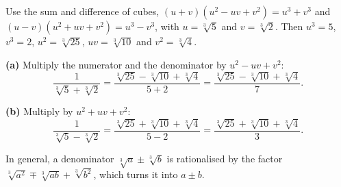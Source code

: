 Use the sum and difference of cubes, $(u+v)(u^2-uv+v^2)=u^3+v^3$ and $(u-v)(u^2+uv+v^2)=u^3-v^3$, with $u=\sqrt[3]{5}$ and $v=\sqrt[3]{2}$. Then $u^3=5$, $v^3=2$, $u^2=\sqrt[3]{25}$, $uv=\sqrt[3]{10}$ and $v^2=\sqrt[3]{4}$.

\textbf{(a)} Multiply the numerator and the denominator by $u^2-uv+v^2$:
\[
\dfrac{1}{\sqrt[3]{5}+\sqrt[3]{2}}=\dfrac{\sqrt[3]{25}-\sqrt[3]{10}+\sqrt[3]{4}}{5+2}=\boxed{\dfrac{\sqrt[3]{25}-\sqrt[3]{10}+\sqrt[3]{4}}{7}} .
\]

\textbf{(b)} Multiply by $u^2+uv+v^2$:
\[
\dfrac{1}{\sqrt[3]{5}-\sqrt[3]{2}}=\dfrac{\sqrt[3]{25}+\sqrt[3]{10}+\sqrt[3]{4}}{5-2}=\boxed{\dfrac{\sqrt[3]{25}+\sqrt[3]{10}+\sqrt[3]{4}}{3}} .
\]

In general, a denominator $\sqrt[3]{a}\pm\sqrt[3]{b}$ is rationalised by the factor $\sqrt[3]{a^2}\mp\sqrt[3]{ab}+\sqrt[3]{b^2}$, which turns it into $a\pm b$.
